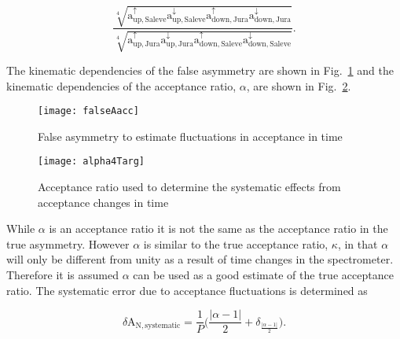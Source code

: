 \begin{equation}
  \frac{
    \sqrt[4]{
      \mathrm{a}^{\uparrow}_{\mathrm{up,Saleve}}
      \mathrm{a}^{\downarrow}_{\mathrm{up,Saleve}}
      \mathrm{a}^{\uparrow}_{\mathrm{down,Jura}}
      \mathrm{a}^{\downarrow}_{\mathrm{down,Jura}}}
  }{
    \sqrt[4]{
      \mathrm{a}^{\uparrow}_{\mathrm{up,Jura}}
      \mathrm{a}^{\downarrow}_{\mathrm{up,Jura}}
      \mathrm{a}^{\uparrow}_{\mathrm{down,Saleve}}
      \mathrm{a}^{\downarrow}_{\mathrm{down,Saleve}}}
  }.
\end{equation}

\noindent
The kinematic dependencies of the false asymmetry are shown in
Fig.~\ref{fig::falseAacc} and the kinematic dependencies of the acceptance
ratio, $\alpha$, are shown in Fig.~\ref{fig::alpha}.

\begin{figure}[h!t]
  \begin{center}
    \texttt{[image: falseAacc]}
    \caption{False asymmetry to estimate fluctuations in acceptance in time}
    \label{fig::falseAacc}
  \end{center}
\end{figure}

\begin{figure}[h!t]
  \begin{center}
    \texttt{[image: alpha4Targ]}
    \caption{Acceptance ratio used to determine the systematic effects from
      acceptance changes in time}
    \label{fig::alpha}
  \end{center}
\end{figure}

\noindent
While $\alpha$ is an acceptance ratio it is not the same as the acceptance ratio
in the true asymmetry.  However $\alpha$ is similar to the true acceptance
ratio, $\kappa$, in that $\alpha$ will only be different from unity as a result
of time changes in the spectrometer.  Therefore it is assumed $\alpha$ can be
used as a good estimate of the true acceptance ratio.  The systematic error due
to acceptance fluctuations is determined as

\begin{equation}
  \delta\mathrm{A}_{\mathrm{N,systematic}} =
  \frac{1}{P} \Big(\frac{|\alpha-1|}{2} + \delta_{\frac{|\alpha-1|}{2}} \Big).
\end{equation}



